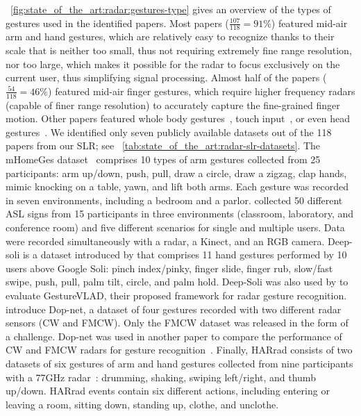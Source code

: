 \fig~\ref{fig:state_of_the_art:radar:gestures-type} gives an overview of the types of gestures used in the identified papers. Most papers ($\frac{107}{118}=91\%$) featured mid-air arm and hand gestures, which are relatively easy to recognize thanks to their scale that is neither too small, thus not requiring extremely fine range resolution, nor too large, which makes it possible for the radar to focus exclusively on the current user, thus simplifying signal processing. Almost half of the papers ($\frac{54}{118}=46\%$) featured mid-air finger gestures, which require higher frequency radars (capable of finer range resolution) to accurately capture the fine-grained finger motion. Other papers featured whole body gestures~\cite{Li:2009,Li:2020b,Vandersmissen:2020}, touch input~\cite{Copic:2019,Wu:2020}, or even head gestures~\cite{Wan:2014}.
%
We identified only seven publicly available datasets out of the 118 papers from our SLR; see \tab~\ref{tab:state_of_the_art:radar-slr-datasets}. 
The mHomeGes dataset~\cite{Liu:2020b} comprises 10 types of arm gestures collected from 25 participants: arm up/down, push, pull, draw a circle, draw a zigzag, clap hands, mimic knocking on a table, yawn, and lift both arms. Each gesture was recorded in seven environments, including a bedroom and a parlor.
\cite{Santhalingam:2020b} collected 50 different ASL signs from 15 participants in three environments (classroom, laboratory, and conference room) and five different scenarios for single and multiple users. Data were recorded simultaneously with a radar, a Kinect, and an RGB camera.
%
Deep-soli is a dataset introduced by \cite{Wang:2016} that comprises 11 hand gestures performed by 10 users above Google Soli: pinch index/pinky, finger slide, finger rub, slow/fast swipe, push, pull, palm tilt, circle, and palm hold. Deep-Soli was also used by \cite{Berenguer:2019} to evaluate GestureVLAD, their proposed framework for radar gesture recognition.
%
\cite{Ritchie:2020} introduce Dop-net, a dataset of four gestures recorded with two different radar sensors (CW and FMCW). Only the FMCW dataset was released in the form of a challenge. Dop-net was used in another paper to compare the performance of CW and FMCW radars for gesture recognition~\cite{Bannon:2020}.
%
Finally, HARrad consists of two datasets of six gestures of arm and hand gestures collected from nine participants with a 77GHz radar~\cite{Vandersmissen:2020}: drumming, shaking, swiping left/right, and thumb up/down. HARrad events contain six different actions, including entering or leaving a room, sitting down, standing up, clothe, and unclothe.

